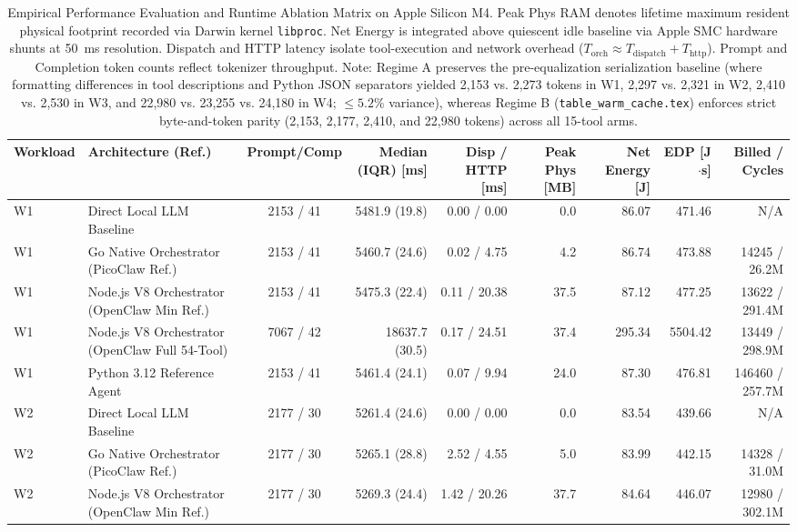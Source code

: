 \begin{table}[t]
\centering
\caption{Empirical Performance Evaluation and Runtime Ablation Matrix on Apple Silicon M4. Peak Phys RAM denotes lifetime maximum resident physical footprint recorded via Darwin kernel \texttt{libproc}. Net Energy is integrated above quiescent idle baseline via Apple SMC hardware shunts at 50~ms resolution. Dispatch and HTTP latency isolate tool-execution and network overhead ($T_{\text{orch}} \approx T_{\text{dispatch}} + T_{\text{http}}$). Prompt and Completion token counts reflect tokenizer throughput. Note: Regime A preserves the pre-equalization serialization baseline (where formatting differences in tool descriptions and Python JSON separators yielded 2,153 vs. 2,273 tokens in W1, 2,297 vs. 2,321 in W2, 2,410 vs. 2,530 in W3, and 22,980 vs. 23,255 vs. 24,180 in W4; $\le 5.2\%$ variance), whereas Regime B (\texttt{table\_warm\_cache.tex}) enforces strict byte-and-token parity (2,153, 2,177, 2,410, and 22,980 tokens) across all 15-tool arms.}
\label{tab:evaluation_ablation_m4}
\small
\begin{tabular}{l l c r r r r r r}
\hline
\textbf{Workload} & \textbf{Architecture (Ref.)} & \textbf{Prompt/Comp} & \textbf{Median (IQR) [ms]} & \textbf{Disp / HTTP [ms]} & \textbf{Peak Phys [MB]} & \textbf{Net Energy [J]} & \textbf{EDP [J$\cdot$s]} & \textbf{Billed / Cycles} \\
\hline
W1 & Direct Local LLM Baseline & 2153 / 41 & 5481.9 (19.8) & 0.00 / 0.00 & 0.0 & 86.07 & 471.46 & N/A \\
W1 & Go Native Orchestrator (PicoClaw Ref.) & 2153 / 41 & 5460.7 (24.6) & 0.02 / 4.75 & 4.2 & 86.74 & 473.88 & 14245 / 26.2M \\
W1 & Node.js V8 Orchestrator (OpenClaw Min Ref.) & 2153 / 41 & 5475.3 (22.4) & 0.11 / 20.38 & 37.5 & 87.12 & 477.25 & 13622 / 291.4M \\
W1 & Node.js V8 Orchestrator (OpenClaw Full 54-Tool) & 7067 / 42 & 18637.7 (30.5) & 0.17 / 24.51 & 37.4 & 295.34 & 5504.42 & 13449 / 298.9M \\
W1 & Python 3.12 Reference Agent & 2153 / 41 & 5461.4 (24.1) & 0.07 / 9.94 & 24.0 & 87.30 & 476.81 & 146460 / 257.7M \\
\hline
W2 & Direct Local LLM Baseline & 2177 / 30 & 5261.4 (24.6) & 0.00 / 0.00 & 0.0 & 83.54 & 439.66 & N/A \\
W2 & Go Native Orchestrator (PicoClaw Ref.) & 2177 / 30 & 5265.1 (28.8) & 2.52 / 4.55 & 5.0 & 83.99 & 442.15 & 14328 / 31.0M \\
W2 & Node.js V8 Orchestrator (OpenClaw Min Ref.) & 2177 / 30 & 5269.3 (24.4) & 1.42 / 20.26 & 37.7 & 84.64 & 446.07 & 12980 / 302.1M \\

\end{tabular}
\end{table}

